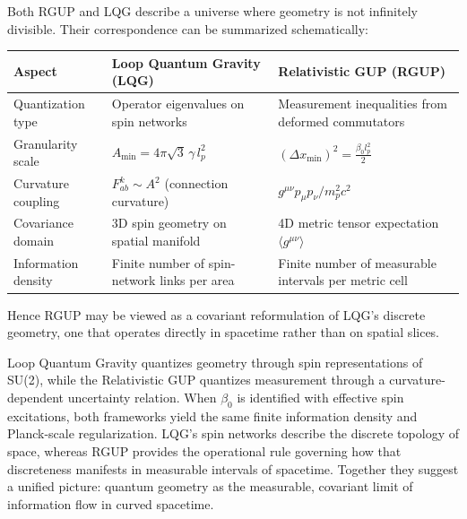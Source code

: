\documentclass[11pt,oneside]{book}
\newenvironment{booknote}{
  \begin{tcolorbox}[
    colback=gray!3!white,
    colframe=gray!45!black,
    fonttitle=\bfseries,
    title=\textbf{Book Note},
  ]
}{\end{tcolorbox}}
\numberwithin{equation}{chapter}
\begin{document}
Both RGUP and LQG describe a universe where geometry is not infinitely divisible.  
Their correspondence can be summarized schematically:

\begin{center}
\small
\setlength{\tabcolsep}{4pt}
\renewcommand{\arraystretch}{1.1}
\begin{tabular}{|p{2.9cm}|p{3.6cm}|p{4.2cm}|}
\hline
\textbf{Aspect} & \textbf{Loop Quantum Gravity (LQG)} & \textbf{Relativistic GUP (RGUP)} \\ \hline
Quantization type & Operator eigenvalues on spin networks & Measurement inequalities from deformed commutators \\ \hline
Granularity scale & $A_{\min}=4\pi\sqrt{3}\,\gamma\,l_p^2$ & $(\Delta x_{\min})^2=\tfrac{\beta_0 l_p^2}{2}$ \\ \hline
Curvature coupling & $F_{ab}^k \!\sim\! A^2$ (connection curvature) & $g^{\mu\nu}p_\mu p_\nu / m_p^2 c^2$ \\ \hline
Covariance domain & 3D spin geometry on spatial manifold & 4D metric tensor expectation $\langle g^{\mu\nu}\rangle$ \\ \hline
Information density & Finite number of spin-network links per area & Finite number of measurable intervals per metric cell \\ \hline
\end{tabular}
\normalsize
\end{center}

Hence RGUP may be viewed as a covariant reformulation of LQG’s discrete geometry, one that operates directly in spacetime rather than on spatial slices.

\begin{booknote}
Loop Quantum Gravity quantizes geometry through spin representations of SU(2), while the Relativistic GUP quantizes measurement through a curvature-dependent uncertainty relation.  
When $\beta_0$ is identified with effective spin excitations, both frameworks yield the same finite information density and Planck-scale regularization.  
LQG’s spin networks describe the discrete topology of space, whereas RGUP provides the operational rule governing how that discreteness manifests in measurable intervals of spacetime.  
Together they suggest a unified picture: quantum geometry as the measurable, covariant limit of information flow in curved spacetime.
\end{booknote}

\end{document}

